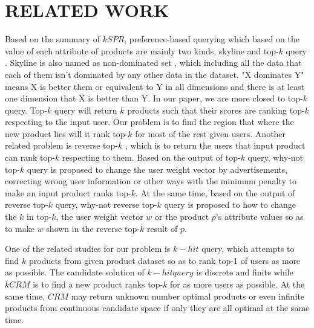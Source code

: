 \chapter{RELATED WORK}
\label{chap:related}
Based on the summary of $kSPR$\cite{tang_mouratidis_yiu_2017}, 
preference-based querying which based on the value of each attribute of products
are mainly two kinds, skyline \cite{borzsony_kossmann_stocker, papadias_tao_fu_seeger_2005, Efficient_Progeressive, kossmann_ramsak_rost_2002}
and top-$k$ query 
\cite{chang_bergman_castelli_li_lo_smith_2000, hristidis_papakonstantinou_2004, prefer, towards_robust, zou_chen_2008}. 
Skyline is also named as non-dominated set 
\cite{996017}, 
which including all 
the data that each of them isn't dominated by any other data in the dataset. "X dominates Y" 
means X is better them or equivalent to Y in all dimensions and there is at least one dimension 
that X is better than Y. In our paper, we are more closed to top-$k$ query.  Top-$k$ query 
will return $k$ products such that their scores are ranking top-$k$ respecting to the 
input user. Our problem is to find the region that where the new product lies 
will it rank top-$k$ for most of the rest given users. Another related problem is 
reverse top-$k$ \cite{vlachou_doulkeridis_xx, vlachou_doulkeridis_kotidis_norvag_2010, vlachou_doulkeridis_kotidis_norvag_2011}, 
which is to return the users that input product can rank top-$k$ 
respecting to them. Based on the output of top-$k$ query, why-not top-$k$ query 
\cite{6268270} is proposed
to change the user weight vector by advertisements, correcting wrong user information or other ways
with the minimum penalty to make an input product ranks top-$k$.  At the same time, 
based on the output of reverse top-$k$ query, why-not reverse top-$k$ query
\cite{gao_liu_chen_zheng_zhou_2015} is proposed to how to change the $k$ in top-$k$, 
the user weight vector $w$ or the product $p$'s attribute values so as to make $w$ shown in 
the reverse top-$k$ result of $p$.  


One of the related studies for our problem is $k-hit$ query\cite{peng_wong_2015}, which 
attempts to find 
$k$ products from given product dataset so as to rank top-1 of users as more as 
possible. The candidate solution of $k-hit query$ is discrete and finite while $kCRM$ 
is to 
find a new product ranks top-$k$ for as more users as possible.  At the same time, 
$CRM$ may return unknown number optimal products or even infinite products from continuous 
candidate space if only 
they are all optimal at the same time. 


